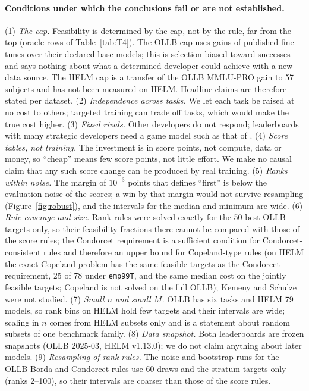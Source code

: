 \documentclass{article}
\begin{document}
\paragraph{Conditions under which the conclusions fail or are not established.}
(1) \emph{The cap.} Feasibility is determined by the cap, not by the rule, far from the top (oracle rows of Table~\ref{tab:T4}). The OLLB cap uses gains of published fine-tunes over their declared base models; this is selection-biased toward successes and says nothing about what a determined developer could achieve with a new data source. The HELM cap is a transfer of the OLLB MMLU-PRO gain to 57 subjects and has not been measured on HELM. Headline claims are therefore stated per dataset. (2) \emph{Independence across tasks.} We let each task be raised at no cost to others; targeted training can trade off tasks, which would make the true cost higher. (3) \emph{Fixed rivals.} Other developers do not respond; leaderboards with many strategic developers need a game model such as that of \citet{chen2026incentives}. (4) \emph{Score tables, not training.} The investment is in score points, not compute, data or money, so ``cheap'' means few score points, not little effort. We make no causal claim that any such score change can be produced by real training. (5) \emph{Ranks within noise.} The margin of $10^{-3}$ points that defines ``first'' is below the evaluation noise of the scores; a win by that margin would not survive resampling (Figure~\ref{fig:robust}), and the intervals for the median and minimum are wide. (6) \emph{Rule coverage and size.} Rank rules were solved exactly for the 50 best OLLB targets only, so their feasibility fractions there cannot be compared with those of the score rules; the Condorcet requirement is a sufficient condition for Condorcet-consistent rules and therefore an upper bound for Copeland-type rules (on HELM the exact Copeland problem has the same feasible targets as the Condorcet requirement, 25 of 78 under \texttt{emp99T}, and the same median cost on the jointly feasible targets; Copeland is not solved on the full OLLB); Kemeny and Schulze were not studied. (7) \emph{Small $n$ and small $M$.} OLLB has six tasks and HELM 79 models, so rank bins on HELM hold few targets and their intervals are wide; scaling in $n$ comes from HELM subsets only and is a statement about random subsets of one benchmark family. (8) \emph{Data snapshot.} Both leaderboards are frozen snapshots (OLLB 2025-03, HELM v1.13.0); we do not claim anything about later models. (9) \emph{Resampling of rank rules.} The noise and bootstrap runs for the OLLB Borda and Condorcet rules use 60 draws and the stratum targets only (ranks 2--100), so their intervals are coarser than those of the score rules.
\end{document}
